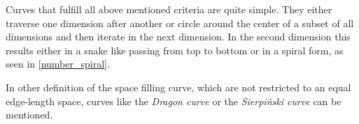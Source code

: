 Curves that fulfill all above mentioned criteria are quite simple. They either traverse one dimension after another or circle around the center of a subset of all dimensions and then iterate in the next dimension. In the second dimension this results either in a snake like passing from top to bottom or in a spiral form, as seen in \ref{number_spiral}.

In other definition of the space filling curve, which are not restricted to an equal edge-length space, curves like the \emph{Dragon curve} or the \emph{Sierpi\`nski curve} can be mentioned.


